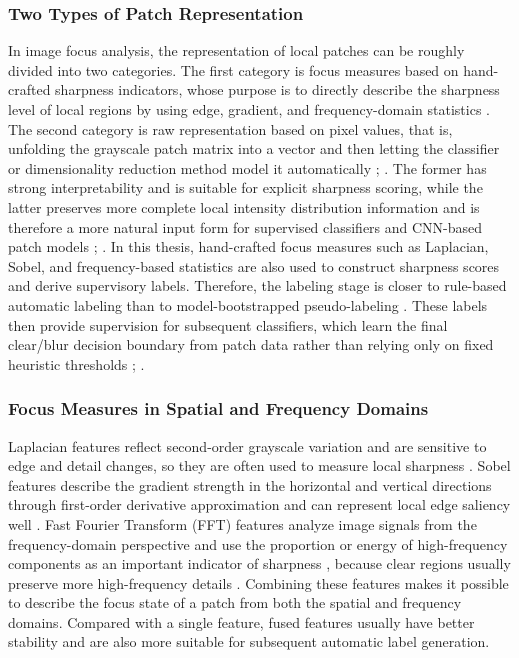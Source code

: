 \subsubsection{Two Types of Patch Representation}
\par In image focus analysis, the representation of local patches can be roughly
divided into two categories. The first category is focus measures based on
hand-crafted sharpness indicators, whose purpose is to directly describe the
sharpness level of local regions by using edge, gradient, and frequency-domain
statistics \cite{5739529,1284395}. The second category is raw representation
based on pixel values, that is, unfolding the grayscale patch matrix into a
vector and then letting the classifier or dimensionality reduction method model
it automatically \cite[pp.~419--496,~651--708]{murphy2022pml};
\cite[pp.~164--223]{goodfellow2016deep}. The former has strong interpretability
and is suitable for explicit sharpness scoring, while the latter preserves more
complete local intensity distribution information and is therefore a more
natural input form for supervised classifiers and CNN-based patch models
\cite[pp.~419--496]{murphy2022pml};
\cite{Hou_2016_CVPR}. In this
thesis, hand-crafted focus measures such as Laplacian, Sobel, and
frequency-based statistics are also used to construct sharpness scores and
derive supervisory labels. Therefore, the labeling stage is closer to rule-based
automatic labeling than to model-bootstrapped pseudo-labeling
\cite{lee2013pseudo,5739529}. These labels then provide supervision for
subsequent classifiers, which learn the final clear/blur decision boundary from
patch data rather than relying only on fixed heuristic thresholds
\cite[pp.~321--618]{murphy2022pml};
\cite{Hou_2016_CVPR}.

\subsubsection{Focus Measures in Spatial and Frequency Domains}
\par Laplacian features reflect second-order grayscale variation and are
sensitive to edge and detail changes, so they are often used to measure local
sharpness \cite{pertuz2013analysis}. Sobel features describe the gradient
strength in the horizontal and vertical directions through first-order
derivative approximation and can represent local edge saliency well
\cite{pertuz2013analysis}. Fast Fourier Transform (FFT) features analyze image
signals from the frequency-domain perspective and use the proportion or energy
of high-frequency components as an important indicator of sharpness
\cite{yap2004image}, because clear regions usually preserve more high-frequency
details \cite{pertuz2013analysis}. Combining these features makes it possible to
describe the focus state of a patch from both the spatial and frequency domains.
Compared with a single feature, fused features
\cite{pertuz2013analysis,yap2004image} usually have better stability and are
also more suitable for subsequent automatic label generation.

